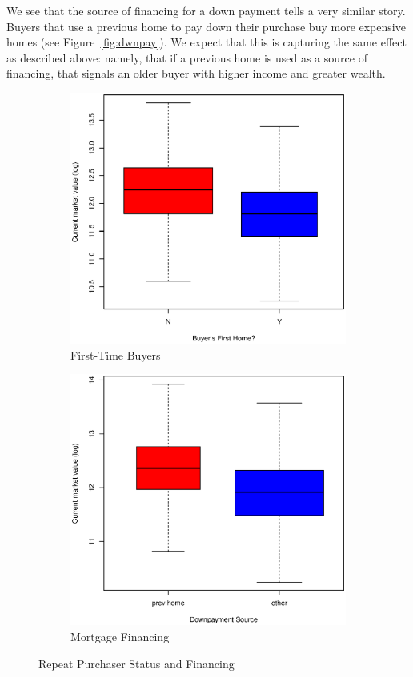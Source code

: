 \documentclass[11pt, fleqn]{article}
\begin{document}
We see that the source of financing for a down payment tells a very similar story. Buyers that use a previous home to pay down their purchase buy more expensive homes (see Figure~\vref{fig:dwnpay}). We expect that this is capturing the same effect as described above: namely, that if a previous home is used as a source of financing, that signals an older buyer with higher income and greater wealth.

\begin{figure}
  \centering
  \begin{subfigure}[b]{0.49\textwidth}
    \includegraphics[width=\textwidth]{frstho.eps}
    \caption{First-Time Buyers}
    \label{fig:frstho}
  \end{subfigure}
  \hfill
  \begin{subfigure}[b]{0.49\textwidth}
    \includegraphics[width=\textwidth]{dwnpay.eps}
    \caption{Mortgage Financing}
    \label{fig:dwnpay}
  \end{subfigure}
  \caption{Repeat Purchaser Status and Financing}
\end{figure}
\end{document}
